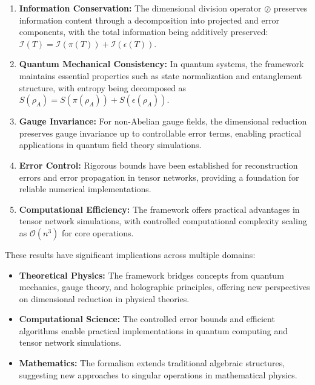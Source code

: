 \documentclass[sn-mathphys-num]{sn-jnl}
\theoremstyle{thmstyleone}
\theoremstyle{thmstyletwo}
\theoremstyle{thmstylethree}
\begin{document}
\begin{enumerate}
    \item \textbf{Information Conservation:} The dimensional division operator $\oslash$ preserves information content through a decomposition into projected and error components, with the total information being additively preserved: $\mathcal{I}(T) = \mathcal{I}(\pi(T)) + \mathcal{I}(\epsilon(T))$.
    
    \item \textbf{Quantum Mechanical Consistency:} In quantum systems, the framework maintains essential properties such as state normalization and entanglement structure, with entropy being decomposed as $S(\rho_A) = S(\pi(\rho_A)) + S(\epsilon(\rho_A))$.
    
    \item \textbf{Gauge Invariance:} For non-Abelian gauge fields, the dimensional reduction preserves gauge invariance up to controllable error terms, enabling practical applications in quantum field theory simulations.
    
    \item \textbf{Error Control:} Rigorous bounds have been established for reconstruction errors and error propagation in tensor networks, providing a foundation for reliable numerical implementations.
    
    \item \textbf{Computational Efficiency:} The framework offers practical advantages in tensor network simulations, with controlled computational complexity scaling as $\mathcal{O}(n^3)$ for core operations.
\end{enumerate}

These results have significant implications across multiple domains:

\begin{itemize}
    \item \textbf{Theoretical Physics:} The framework bridges concepts from quantum mechanics, gauge theory, and holographic principles, offering new perspectives on dimensional reduction in physical theories.
    
    \item \textbf{Computational Science:} The controlled error bounds and efficient algorithms enable practical implementations in quantum computing and tensor network simulations.
    
    \item \textbf{Mathematics:} The formalism extends traditional algebraic structures, suggesting new approaches to singular operations in mathematical physics.
\end{itemize}
\end{document}
